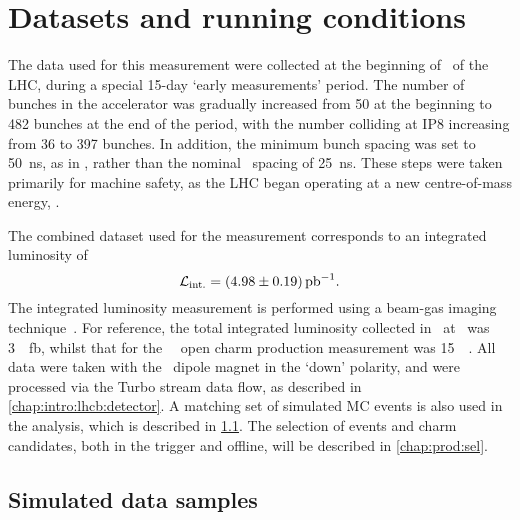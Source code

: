\chapter{Datasets and running conditions}
\label{chap:prod:data}

The data used for this measurement were collected at the beginning of \runtwo\ 
of the \ac{LHC}, during a special 15-day `early measurements' period.
The number of bunches in the accelerator was gradually increased from 50 at the 
beginning to 482 bunches at the end of the period, with the number colliding at 
IP8 increasing from 36 to 397 bunches.
In addition, the minimum bunch spacing was set to \SI{50}{\nano\second}, as in 
\runone, rather than the nominal \runtwo\ spacing of \SI{25}{\nano\second}.
These steps were taken primarily for machine safety, as the \ac{LHC} began 
operating at a new centre-of-mass energy, \sqrtseq{13}.

The combined dataset used for the measurement corresponds to an integrated 
luminosity of
\begin{equation}
  \intlumi = \SI{\xsectotlumi}{\per\pico\barn}.
  \label{eqn:prod:xsectotlumi}
\end{equation}
The integrated luminosity measurement is performed using a beam-gas imaging 
technique~\cite{LHCb-PAPER-2014-047}.
For reference, the total integrated luminosity collected in \runone\ at \lhcb\ 
was \SI{3}{\per\femto\barn}, whilst that for the \ \lhcb\ open charm 
production measurement was \SI{15}{\per\nb}.
All data were taken with the \lhcb\ dipole magnet in the `down' polarity, and 
were processed via the Turbo stream data flow, as described in 
\cref{chap:intro:lhcb:detector}.
A matching set of simulated \ac{MC} events is also used in the analysis, which 
is described in \cref{chap:prod:data:mc}.
The selection of events and charm candidates, both in the trigger and offline, 
will be described in \cref{chap:prod:sel}.

\section{Simulated data samples}
\label{chap:prod:data:mc}

